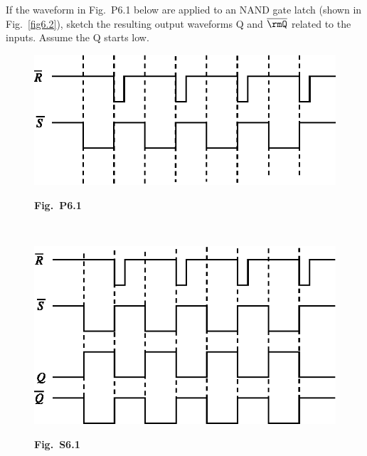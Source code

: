 \begin{problem}\label{prob6.1}
If the waveform in Fig.~P6.1 below are applied to an NAND gate
latch (shown in Fig.~\ref{fig6.2}), sketch the resulting output
waveforms Q and $\overline{\rmQ}$ related to the inputs. Assume the Q
starts low.
\begin{figure}[H]
\centering
\includegraphics[scale=1.05]{chap6/sol.6.2.1(a).eps}

\medskip
{\bf Fig.~P6.1}
\end{figure}
\end{problem}

\eject

\begin{solution}
~
\begin{figure}[H]
\centering
\includegraphics[scale=1.05]{chap6/sol6.2.1.eps}


\medskip
{\bf Fig.~S6.1}
\end{figure}
\end{solution}

